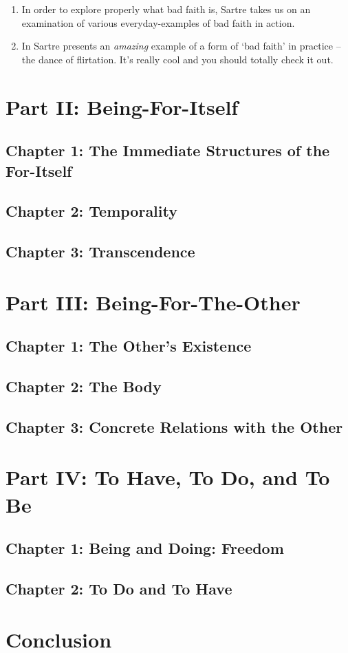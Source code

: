 \begin{enumerate}
  \item In order to explore properly what bad faith is, Sartre takes us on an examination of various everyday-examples of bad faith in action.
  \item In \autocite[98]{sartre} Sartre presents an \emph{amazing} example of a form of `bad faith' in practice -- the dance of flirtation. It's really cool and you should totally check it out.
\end{enumerate}

\section{Part II: Being-For-Itself}

\subsection{Chapter 1: The Immediate Structures of the For-Itself}

\subsection{Chapter 2: Temporality}

\subsection{Chapter 3: Transcendence}

\section{Part III: Being-For-The-Other}

\subsection{Chapter 1: The Other's Existence}

\subsection{Chapter 2: The Body}

\subsection{Chapter 3: Concrete Relations with the Other}

\section{Part IV: To Have, To Do, and To Be}

\subsection{Chapter 1: Being and Doing: Freedom}

\subsection{Chapter 2: To Do and To Have}

\section{Conclusion}
